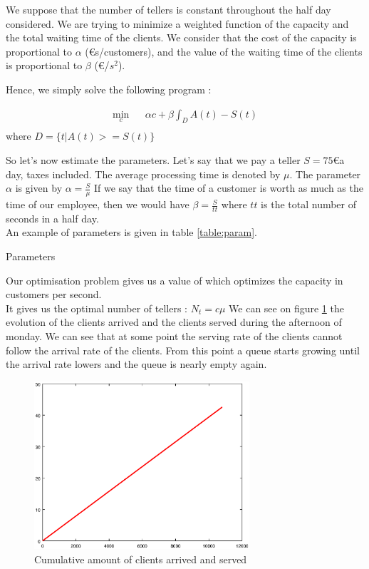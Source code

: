 \documentclass[12pt,a4paper,notitlepage]{report}
\begin{document}
We suppose that the number of tellers is constant throughout the half day considered.
We are trying to minimize a weighted function of the capacity and the total waiting time of the clients.
We consider that the cost of the capacity is proportional to $ \alpha$ (\euro s/customers), and the value of the waiting time of the clients is proportional to $\beta$ (\euro/$s^2$).

Hence, we simply solve the following program :

\begin{eqnarray*}
\min_c & & \alpha c + \beta \int_D A(t)-S(t)\\
\end{eqnarray*}
where $D = \{t | A(t)>=S(t) \}$

So let's now estimate the parameters. Let's say that we pay a teller $S = 75$\euro a day, taxes included.
The average processing time is denoted by $\mu$. 
The parameter $\alpha$ is given by $\alpha = \frac{S}{\mu}$
If we say that the time of a customer is worth as much as the time of our employee, then we would have $\beta = \frac{S}{tt}$ where $tt$ is the total number of seconds in a half day.\\
An example of parameters is given in table \ref{table:param}.
\begin{table}

\caption{Parameters\label{table:param}}
\end{table}

Our optimisation problem gives us a value of  which optimizes the capacity in customers per second.\\
It gives us the optimal number of tellers : $N_t = c \mu$
We can see on figure \ref{fig:clients_lun} the evolution of the clients arrived and the clients served during the afternoon of monday. We can see that at some point the serving rate of the clients cannot follow the arrival rate of the clients. From this point a queue starts growing until the arrival rate lowers and the queue is nearly empty again.
\begin{figure}[h]
\centering
\includegraphics[width = 8cm]{half_day_test_clients_served.eps}
\caption{Cumulative amount of clients arrived and served\label{fig:clients_lun}}
\end{figure}
\end{document}
